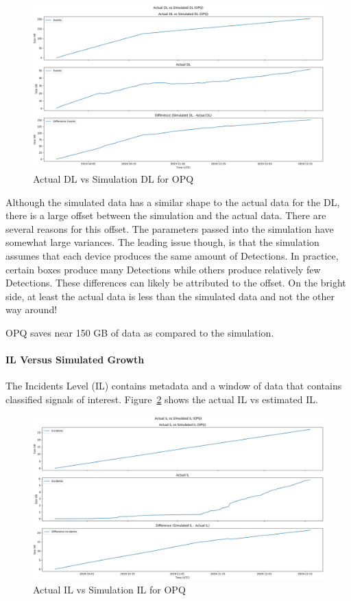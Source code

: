 \begin{figure}[H]
    \centering
    \includegraphics[width=\linewidth]{figures/actual_dl_vs_sim_opq.png}
    \caption{Actual DL vs Simulation DL for OPQ}
    \label{fig:actual_dl_vs_sim_opq}
\end{figure}

Although the simulated data has a similar shape to the actual data for the DL, there is a large offset between the simulation and the actual data. There are several reasons for this offset. The parameters passed into the simulation have somewhat large variances. The leading issue though, is that the simulation assumes that each device produces the same amount of Detections. In practice, certain boxes produce many Detections while others produce relatively few Detections. These differences can likely be attributed to the offset. On the bright side, at least the actual data is less than the simulated data and not the other way around!

OPQ saves near 150 GB of data as compared to the simulation.

\paragraph{IL Versus Simulated Growth}
The Incidents Level (IL) contains metadata and a window of data that contains classified signals of interest. Figure~\ref{fig:actual_il_vs_sim_opq} shows the actual IL vs estimated IL.

\begin{figure}[H]
    \centering
    \includegraphics[width=\linewidth]{figures/actual_il_vs_sim_opq.png}
    \caption{Actual IL vs Simulation IL for OPQ}
    \label{fig:actual_il_vs_sim_opq}
\end{figure}

